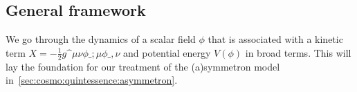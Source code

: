 \subsection{General framework}\label{sec:cosmo:quintessence:framework}
    We go through the dynamics of a scalar field $\phi$ that is associated with a kinetic term $X=- \frac{1}{2} g\^{\mu\nu} \phi\_{;\mu}\phi\_{,\nu}$ and potential energy $V(\phi)$ in broad terms. This will lay the foundation for our treatment of the (a)symmetron model in~\cref{sec:cosmo:quintessence:asymmetron}.



